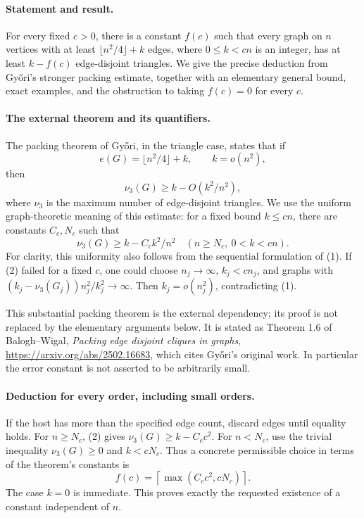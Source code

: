 \paragraph{Statement and result.}
For every fixed \(c>0\), there is a constant \(f(c)\) such that every graph on \(n\) vertices with at least \(\lfloor n^2/4\rfloor+k\) edges, where \(0\leq k<cn\) is an integer, has at least \(k-f(c)\) edge-disjoint triangles. We give the precise deduction from Gy\H{o}ri's stronger packing estimate, together with an elementary general bound, exact examples, and the obstruction to taking \(f(c)=0\) for every \(c\).

\paragraph{The external theorem and its quantifiers.}
The packing theorem of Gy\H{o}ri, in the triangle case, states that if
\[
 e(G)=\lfloor n^2/4\rfloor+k,\qquad k=o(n^2),
\]
then
\[
 \nu_3(G)\geq k-O(k^2/n^2),
\tag{1}
\]
where \(\nu_3\) is the maximum number of edge-disjoint triangles. We use the uniform graph-theoretic meaning of this estimate: for a fixed bound \(k\leq cn\), there are constants \(C_c,N_c\) such that
\[
 \nu_3(G)\geq k-C_c k^2/n^2
 \quad(n\geq N_c,\ 0<k<cn).
\tag{2}
\]
For clarity, this uniformity also follows from the sequential formulation of (1). If (2) failed for a fixed \(c\), one could choose \(n_j\to\infty\), \(k_j<cn_j\), and graphs with
\((k_j-\nu_3(G_j))n_j^2/k_j^2\to\infty\). Then \(k_j=o(n_j^2)\), contradicting (1).

This substantial packing theorem is the external dependency; its proof is not replaced by the elementary arguments below. It is stated as Theorem 1.6 of Balogh--Wigal, \emph{Packing edge disjoint cliques in graphs}, \url{https://arxiv.org/abs/2502.16683}, which cites Gy\H{o}ri's original work. In particular the error constant is not asserted to be arbitrarily small.

\paragraph{Deduction for every order, including small orders.}
If the host has more than the specified edge count, discard edges until equality holds. For \(n\geq N_c\), (2) gives \(\nu_3(G)\geq k-C_c c^2\). For \(n<N_c\), use the trivial inequality \(\nu_3(G)\geq0\) and \(k<cN_c\). Thus a concrete permissible choice in terms of the theorem's constants is
\[
 f(c)=\left\lceil\max(C_c c^2,cN_c)\right\rceil.
\]
The case \(k=0\) is immediate. This proves exactly the requested existence of a constant independent of \(n\).

